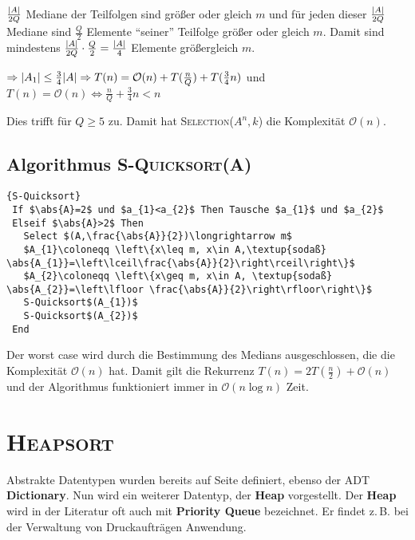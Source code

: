 \documentclass[ngerman,draft,parskip=half*,twoside]{scrreprt}
\theoremstyle{break}
\theoremstyle{nonumberbreak}
\newcommand*{\OO}{\mathcal{O}}      %
\DeclarePairedDelimiter{\abs}{\lvert}{\rvert}
\begin{document}
 $\frac{\abs{A}}{2Q}$ Mediane der Teilfolgen sind größer oder gleich $m$ und für jeden dieser $\frac{\abs{A}}{2Q}$
 Mediane sind $\frac{Q}{2}$ Elemente "`seiner"' Teilfolge größer oder gleich $m$. Damit sind mindestens
 $\frac{\abs{A}}{2Q}\cdot \frac{Q}{2}=\frac{\abs{A}}{4}$ Elemente größergleich $m$.
	
 $\Rightarrow\abs{A_{1}}\leq\frac{3}{4}\abs{A}\Rightarrow T(n)=\OO(n)+T(\frac{n}{Q})+T(\frac{3}{4}n)$
und $T(n)=\OO(n)\Longleftrightarrow\frac{n}{Q}+\frac{3}{4}n<n$

 Dies trifft für $Q\geq 5$ zu. Damit hat \textsc{Selection}($A^n,k$) die Komplexität $\OO(n)$.

 \subsection{Algorithmus \textsc{S-Quicksort(A)}}

\begin{Algorithmus}[ht]
\begin{lstlisting}[frame=tlrb, mathescape=true, title=\textsc{S-Quicksort}, gobble=1]{S-Quicksort}
 If $\abs{A}=2$ und $a_{1}<a_{2}$ Then Tausche $a_{1}$ und $a_{2}$
 Elseif $\abs{A}>2$ Then
   Select $(A,\frac{\abs{A}}{2})\longrightarrow m$
   $A_{1}\coloneqq \left\{x\leq m, x\in A,\textup{sodaß} \abs{A_{1}}=\left\lceil\frac{\abs{A}}{2}\right\rceil\right\}$
   $A_{2}\coloneqq \left\{x\geq m, x\in A, \textup{sodaß} \abs{A_{2}}=\left\lfloor \frac{\abs{A}}{2}\right\rfloor\right\}$
   S-Quicksort$(A_{1})$
   S-Quicksort$(A_{2})$
 End
 \end{lstlisting}
  \end{Algorithmus}

Der worst case wird durch die Bestimmung des Medians ausgeschlossen, die die Komplexität $\OO(n)$ hat. Damit gilt die Rekurrenz
$T(n)=2T(\frac{n}{2})+\OO(n)$ und der Algorithmus funktioniert immer in $\OO(n \log n)$ Zeit.
 
\section{\textsc{Heapsort}}
Abstrakte Datentypen wurden bereits auf Seite \pageref{ADT} definiert, ebenso der ADT \textbf{Dictionary}. Nun wird ein weiterer
Datentyp, der \textbf{Heap} vorgestellt. Der \textbf{Heap} wird in der Literatur oft auch mit \textbf{Priority Queue} bezeichnet.
Er findet z.\,B. bei der Verwaltung von Druckaufträgen Anwendung.
\end{document}
